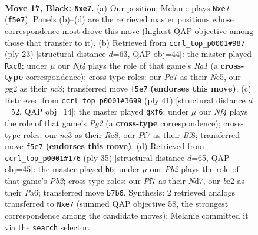 \documentclass[11pt]{article}
\begin{document}
\clearpage

\begin{figure}[p]\centering
\begin{subfigure}{0.46\textwidth}\centering
\resizebox{\linewidth}{!}{%
\newchessgame
\chessboard[
  setfen={r1b3k1/ppppBp1p/8/5np1/8/1PN2P2/P1PPB1PP/R5K1 b - - 0 17},
  showmover=false,
  pgfstyle=straightmove, color=movearrow, markmove={f5-e7}
]}
\caption{}
\end{subfigure}\hfill
\begin{subfigure}{0.46\textwidth}\centering
\resizebox{\linewidth}{!}{%
\newchessgame
\chessboard[
  setfen={r1B1kb1r/pp2p2p/2p3p1/2n5/8/2N5/PPP2PPP/R1B1K2R b KQ - 0 12},
  showmover=false,
  pgfstyle=straightmove, color=movearrow, markmove={a8-c8}
]}
\caption{}
\end{subfigure}
\\[4pt]
\begin{subfigure}{0.46\textwidth}\centering
\resizebox{\linewidth}{!}{%
\newchessgame
\chessboard[
  setfen={4rbk1/pb3ppp/3p1B2/1Pp5/8/5NP1/PP3PBP/R5K1 b - - 0 21},
  showmover=false,
  pgfstyle=straightmove, color=movearrow, markmove={g7-f6}
]}
\caption{}
\end{subfigure}\hfill
\begin{subfigure}{0.46\textwidth}\centering
\resizebox{\linewidth}{!}{%
\newchessgame
\chessboard[
  setfen={r1b1k3/1p1n1p1p/p5p1/2bp4/8/2BNP3/PP3PPP/RN4K1 b - - 1 18},
  showmover=false,
  pgfstyle=straightmove, color=movearrow, markmove={b7-b6}
]}
\caption{}
\end{subfigure}
\caption{\textbf{Move 17, Black: \texttt{Nxe7}.} (a) Our position; Melanie plays \texttt{Nxe7} (\texttt{f5e7}). Panels (b)--(d) are the retrieved master positions whose correspondence most drove this move (highest QAP objective among those that transfer to it). (b) Retrieved from \texttt{ccrl\_top\_p0001\#987} (ply 23) [structural distance $d$=63, QAP obj=44]: the master played \texttt{Rxc8}; under $\mu$ our \emph{Nf4} plays the role of that game's \emph{Ra1} (a \textbf{cross-type} correspondence); cross-type roles: our \emph{P}c7 as their \emph{N}c5, our \emph{p}g2 as their \emph{n}c3; transferred move \texttt{f5e7} \textbf{(endorses this move)}. (c) Retrieved from \texttt{ccrl\_top\_p0001\#3699} (ply 41) [structural distance $d$=52, QAP obj=14]: the master played \texttt{gxf6}; under $\mu$ our \emph{Nf4} plays the role of that game's \emph{Pg2} (a \textbf{cross-type} correspondence); cross-type roles: our \emph{n}c3 as their \emph{R}e8, our \emph{P}f7 as their \emph{B}f8; transferred move \texttt{f5e7} \textbf{(endorses this move)}. (d) Retrieved from \texttt{ccrl\_top\_p0001\#176} (ply 35) [structural distance $d$=65, QAP obj=45]: the master played \texttt{b6}; under $\mu$ our \emph{Pb2} plays the role of that game's \emph{Pb2}; cross-type roles: our \emph{P}f7 as their \emph{N}d7, our \emph{b}e2 as their \emph{P}a6; transferred move \texttt{b7b6}. Synthesis: 2 retrieved analogs transferred to \texttt{Nxe7} (summed QAP objective 58, the strongest correspondence among the candidate moves); Melanie committed it via the \texttt{search} selector.}
\label{fig:thought-m33}
\end{figure}
\end{document}
